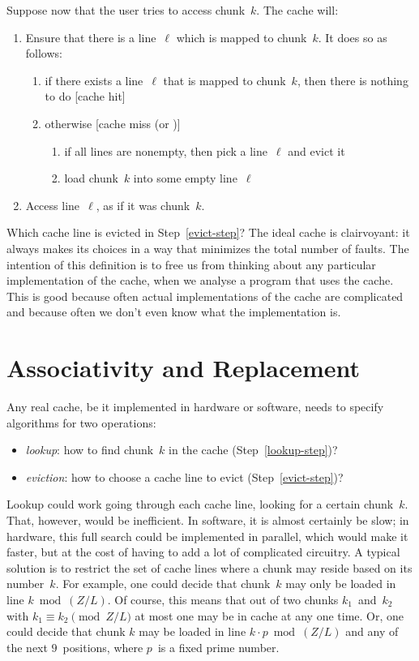 Suppose now that the user tries to access chunk~$k$.
The cache will:
\begin{enumerate}
\item
  Ensure that there is a line~$\ell$ which is mapped to chunk~$k$.
  It does so as follows:
  \begin{enumerate}
  \item \label{lookup-step}
    if there exists a line~$\ell$ that is mapped to chunk~$k$,
    then there is nothing to do [cache hit]
  \item otherwise [cache miss (or )]
    \begin{enumerate}
    \item \label{evict-step}
      if all lines are nonempty, then pick a line~$\ell$ and evict it
    \item
      load chunk~$k$ into some empty line~$\ell$
    \end{enumerate}
  \end{enumerate}
\item Access line~$\ell$, as if it was chunk~$k$.
\end{enumerate}
Which cache line is evicted in Step~\ref{evict-step}?
The ideal cache is clairvoyant:
  it always makes its choices in a way that minimizes the total number of faults.
The intention of this definition is to free us
  from thinking about any particular implementation of the cache,
  when we analyse a program that uses the cache.
This is good because often actual implementations of the cache are complicated
  and because often we don't even know what the implementation is.

\section{Associativity and Replacement}

Any real cache, be it implemented in hardware or software,
  needs to specify algorithms for two operations:
\begin{itemize}
\item \emph{lookup}:
  how to find chunk~$k$ in the cache (Step~\ref{lookup-step})?
\item \emph{eviction}:
  how to choose a cache line to evict (Step~\ref{evict-step})?
\end{itemize}

\smallskip

Lookup could work going through each cache line, looking for a certain chunk~$k$.
That, however, would be inefficient.
In software, it is almost certainly be slow;
  in hardware, this full search could be implemented in parallel,
    which would make it faster,
    but at the cost of having to add a lot of complicated circuitry.
A typical solution is to restrict the set of cache lines where a chunk may reside
  based on its number~$k$.
For example,
  one could decide that chunk~$k$ may only be loaded in line $k \bmod (Z/L)$.
Of course,
  this means that out of two chunks $k_1$~and~$k_2$
    with $k_1 \equiv k_2 \pmod{Z/L}$
  at most one may be in cache at any one time.
Or, one could decide that chunk $k$ may be loaded in line $k\cdot p \bmod (Z/L)$
  and any of the next $9$~positions,
  where $p$~is a fixed prime number.

